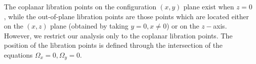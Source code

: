 \documentclass[preprint,fleqn,5p,numbers,sort&compress]{elsarticle}
\begin{document}

The coplanar libration points on the configuration $(x,y)$ plane exist when $z=0$, while the out-of-plane libration points are those points which are located either on the $(x, z)$ plane (obtained by taking $y=0, x\neq0$) or on the $z-$axis. However, we restrict our analysis only to the coplanar libration points.
The position of the libration points is defined through the intersection of the equations $\Omega_x=0, \Omega_y=0$.
\end{document}

